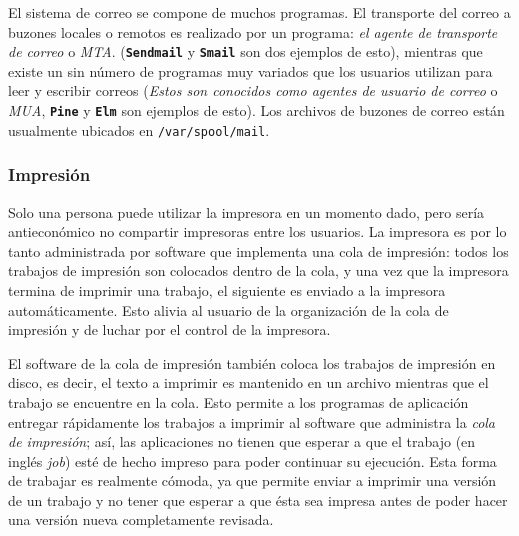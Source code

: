 \documentclass[12pt]{article}
\begin{document}
\begin{}
 El sistema de correo se compone de muchos programas. El transporte del
correo a buzones locales o remotos es realizado por un programa: \textit{el
agente de transporte de correo} o \textit{MTA}.
(\texttt{\textbf{Sendmail}} y \texttt{\textbf{Smail}} son dos ejemplos de
esto), mientras que existe un sin número de programas muy variados que los
usuarios utilizan para leer y escribir correos (\textit{Estos son conocidos
como agentes de usuario de correo }o \textit{MUA},
\texttt{\textbf{Pine}} y \texttt{\textbf{Elm}} son ejemplos de esto). Los
archivos de buzones de correo están usualmente ubicados en
\texttt{/var/spool/mail}.  




\subsubsection{ Impresión}

 Solo una persona puede utilizar la impresora en un momento dado, pero
sería antieconómico no compartir impresoras entre los usuarios. La impresora es
por lo tanto administrada por software que implementa una cola de impresión:
todos los trabajos de impresión son colocados dentro de la cola, y una vez que
la impresora termina de imprimir una trabajo, el siguiente es enviado a la
impresora automáticamente. Esto alivia al usuario de la organización de la cola
de impresión y de luchar por el control de la impresora.  

 El software de la cola de impresión también coloca los trabajos de
impresión en disco, es decir, el texto a imprimir es mantenido en un archivo
mientras que el trabajo se encuentre en la cola. Esto permite a los programas de
aplicación entregar rápidamente los trabajos a imprimir al software que
administra la \textit{cola de impresión}; así, las aplicaciones no
tienen que esperar a que el trabajo (en inglés \textit{job}) esté de hecho impreso para
poder continuar su ejecución. Esta forma de trabajar es realmente cómoda, ya que
permite enviar a imprimir una versión de un trabajo y no tener que esperar a que
ésta sea impresa antes de poder hacer una versión nueva completamente revisada.








\end{}
\end{document}
